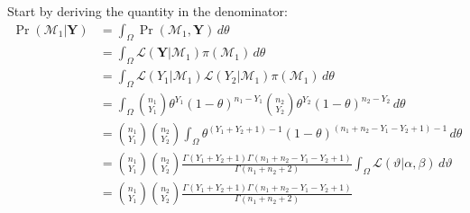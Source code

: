 \documentclass[
]{homework}
\begin{document}
Start by deriving the quantity in the denominator:
\begin{align*}
  \Pr(\mathcal M_1 | \mathbf Y) 
  &= \int_{\Omega} \Pr(\mathcal M_1, \mathbf Y) \, d\theta \\ 
  &= \int_\Omega \mathcal L(\mathbf Y | \mathcal M_1) \pi(\mathcal M_1) \, d\theta \\
  &= \int_\Omega \mathcal L(Y_1 | \mathcal M_1) \mathcal L(Y_2 | \mathcal M_1) \pi(\mathcal M_1) \, d\theta \\
  &= \int_\Omega \binom{n_1}{Y_1} \theta^{Y_1} (1 - \theta)^{n_1 - Y_1} \binom{n_2}{Y_2} \theta^{Y_2} (1 - \theta)^{n_2 - Y_2} \, d\theta \\
  &= \binom{n_1}{Y_1} \binom{n_2}{Y_2} \int_\Omega \theta^{(Y_1 + Y_2 + 1) - 1} (1 - \theta)^{(n_1 + n_2 - Y_1 - Y_2 + 1) - 1} \, d\theta \\
  &= \binom{n_1}{Y_1} \binom{n_2}{Y_2} \frac{\Gamma(Y_1 + Y_2 + 1) \Gamma(n_1 + n_2 - Y_1 - Y_2 + 1)}{\Gamma(n_1 + n_2 + 2)} \int_\Omega \mathcal L(\vartheta | \alpha, \beta) \, d\vartheta \\
  &= \binom{n_1}{Y_1} \binom{n_2}{Y_2} \frac{\Gamma(Y_1 + Y_2 + 1) \Gamma(n_1 + n_2 - Y_1 - Y_2 + 1)}{\Gamma(n_1 + n_2 + 2)}
\end{align*}
\end{document}
